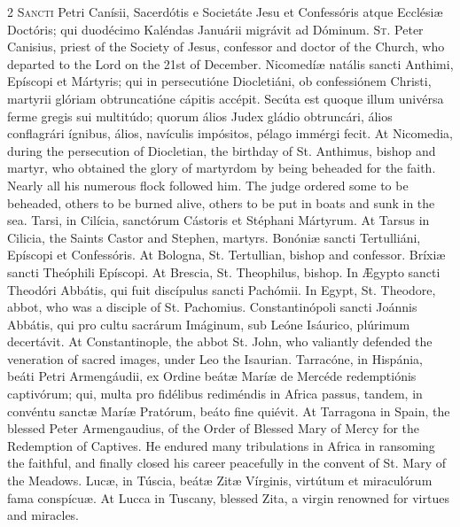 \begin{paracol}{2}
\lettrine[lines=2]{S}{ancti} Petri Canísii, 
 Sacerdótis e Societáte Jesu et Confessóris atque Ecclésiæ Doctóris; qui 
 duodécimo Kaléndas Januárii migrávit ad Dóminum.
\switchcolumn
{}
\lettrine[lines=2]{S}{t.} Peter Canisius, priest of the 
 Society of Jesus, confessor and doctor of the Church, who departed to the 
 Lord on the 21st of December.
\switchcolumn*
{}
Nicomedíæ natális 
 sancti Anthimi, Epíscopi et Mártyris; qui in persecutióne Diocletiáni, ob 
 confessiónem Christi, martyrii glóriam obtruncatióne cápitis accépit. 
 Secúta est quoque illum univérsa ferme gregis sui multitúdo; quorum álios 
 Judex gládio obtruncári, álios conflagrári ígnibus, álios, navículis 
 impósitos, pélago immérgi fecit.
\switchcolumn
{}
At Nicomedia, during the 
 persecution of Diocletian, the birthday of St. Anthimus, bishop and martyr, 
 who obtained the glory of martyrdom by being beheaded for the faith. 
 Nearly all his numerous flock followed him. The judge ordered some to 
 be beheaded, others to be burned alive, others to be put in boats and sunk 
 in the sea.
\switchcolumn*
{}
Tarsi, in Cilícia, 
 sanctórum Cástoris et Stéphani Mártyrum.
\switchcolumn
{}
At Tarsus in Cilicia, the Saints 
 Castor and Stephen, martyrs.
\switchcolumn*
{}
Bonóniæ sancti 
 Tertulliáni, Epíscopi et Confessóris.
\switchcolumn
{}
At Bologna, St. Tertullian, bishop 
 and confessor.
\switchcolumn*
{}
Bríxiæ sancti 
 Theóphili Epíscopi.
\switchcolumn
{}
At Brescia, St. Theophilus, bishop.
\switchcolumn*
{}
In Ægypto sancti 
 Theodóri Abbátis, qui fuit discípulus sancti Pachómii.
\switchcolumn
{}
In Egypt, St. Theodore, abbot, who 
 was a disciple of St. Pachomius.
\switchcolumn*
{}
Constantinópoli sancti 
 Joánnis Abbátis, qui pro cultu sacrárum Imáginum, sub Leóne Isáurico, 
 plúrimum decertávit.
\switchcolumn
{}
At Constantinople, the abbot St. 
 John, who valiantly defended the veneration of sacred images, under Leo the 
 Isaurian.
\switchcolumn*
{}
Tarracóne, in 
 Hispánia, beáti Petri Armengáudii, ex Ordine beátæ Maríæ de Mercéde 
 redemptiónis captivórum; qui, multa pro fidélibus rediméndis in Africa 
 passus, tandem, in convéntu sanctæ Maríæ Pratórum, beáto fine quiévit.
\switchcolumn
{}
At Tarragona in Spain, the blessed 
 Peter Armengaudius, of the Order of Blessed Mary of Mercy for the Redemption 
 of Captives. He endured many tribulations in Africa in ransoming the 
 faithful, and finally closed his career peacefully in the convent of St. 
 Mary of the Meadows.
\switchcolumn*
{}
Lucæ, in Túscia, beátæ 
 Zitæ Vírginis, virtútum et miraculórum fama conspícuæ.
\switchcolumn
{}
At Lucca in Tuscany, blessed Zita, a 
 virgin renowned for virtues and miracles.
\switchcolumn*
{}
\end{paracol}


